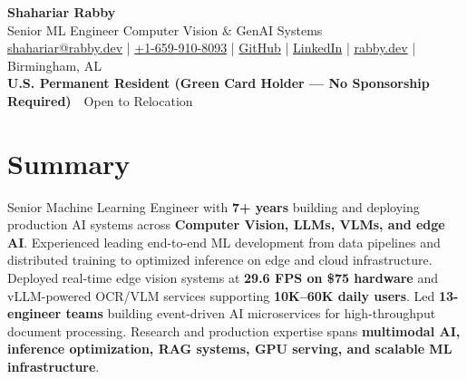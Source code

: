 \documentclass[10pt,letterpaper]{article}
\newcommand{\contactsep}{\,\textcolor{muted}{\textbar}\,}
\begin{document}
\begin{center}
  {\fontsize{22}{24}\selectfont\bfseries\textcolor{textgray}{Shahariar Rabby}}\\[0.5pt]
  {\small\color{muted}Senior ML Engineer \quad\textbar\quad Computer Vision \& GenAI Systems}\\[2pt]
  {\small
    \href{mailto:shahariar@rabby.dev}{shahariar@rabby.dev} \enspace|\enspace
    \href{tel:+16599108093}{+1-659-910-8093} \enspace|\enspace
    \href{https://github.com/shahariarrabby}{GitHub} \enspace|\enspace
    \href{https://www.linkedin.com/in/shahariarrabby}{LinkedIn} \enspace|\enspace
    \href{https://rabby.dev}{rabby.dev} \enspace|\enspace
    Birmingham, AL
  }\\[0.5pt]
  {\small\textbf{U.S. Permanent Resident (Green Card Holder --- No Sponsorship Required)} \contactsep
  Open to Relocation}
\end{center}

\vspace{2pt}

\section*{Summary}
\vspace{0.5pt}
{\small Senior Machine Learning Engineer with \textbf{7+ years} building and deploying production AI systems across \textbf{Computer Vision, LLMs, VLMs, and edge AI}. Experienced leading end-to-end ML development from data pipelines and distributed training to optimized inference on edge and cloud infrastructure. Deployed real-time edge vision systems at \textbf{29.6 FPS on \$75 hardware} and vLLM-powered OCR/VLM services supporting \textbf{10K--60K daily users}. Led \textbf{13-engineer teams} building event-driven AI microservices for high-throughput document processing. Research and production expertise spans \textbf{multimodal AI, inference optimization, RAG systems, GPU serving, and scalable ML infrastructure}.}

\vspace{0.5pt}
\end{document}
